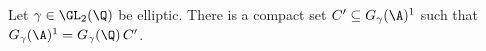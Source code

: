 Let $\gamma\in\GL_2(\Q)$ be elliptic. There is a compact set $C'\subseteq G_\gamma(\A)^1$ such that $G_\gamma(\A)^1=G_\gamma(\Q)\,C'$.
